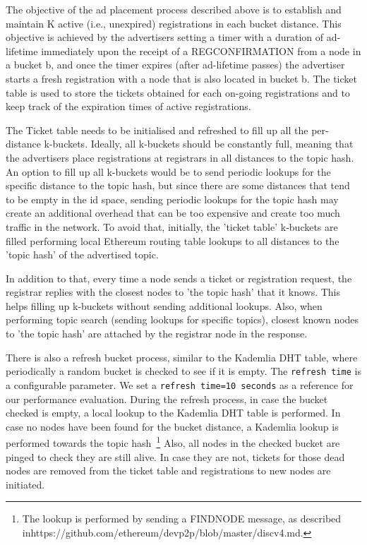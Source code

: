 The objective of the ad placement process described above is to establish and maintain K active (i.e., unexpired) registrations in each bucket distance. 
This objective is achieved by the advertisers setting a timer with a duration of ad-lifetime immediately upon the receipt of a REGCONFIRMATION from a node in a bucket b, and once the timer expires (after ad-lifetime passes) the advertiser starts a fresh registration with a node that is also located in bucket b. 
The ticket table is used to store the tickets obtained for each on-going registrations and to keep track of the expiration times of active registrations.


The Ticket table needs to be initialised and refreshed to fill up all the per-distance k-buckets. 
Ideally,  all k-buckets should be constantly full,  meaning that the advertisers place registrations at registrars in all distances to the topic hash. 
An option to fill up all k-buckets would be to send periodic lookups for the specific distance to the topic hash, but since there are some distances that tend to be empty in the id space,  sending periodic lookups for the topic hash may create an additional overhead that can be too expensive and create too much traffic in the network. To avoid that, initially, the 'ticket table' k-buckets are filled performing local Ethereum routing table lookups to all distances to the 'topic hash' of the advertised topic.

In addition to that, every time a node sends a ticket or registration request, the registrar replies with the closest nodes to 'the topic hash' that it knows. 
This helps filling up k-buckets without sending additional lookups. 
Also, when performing topic search (sending lookups for specific topics),  closest known nodes to 'the topic hash' are attached by the registrar node in the response.

There is  also a refresh bucket process,  similar to the Kademlia DHT table,  where periodically a random bucket is checked to see if it is empty.
The \texttt{refresh time} is a configurable parameter. 
We set a \texttt{refresh time=10 seconds} as a reference for our performance evaluation.
During the refresh process,  in case the bucket checked is empty, 
a local lookup to the Kademlia DHT table is performed. 
In case no nodes have been found for the bucket distance,  a Kademlia lookup is performed towards the topic hash~\footnote{The lookup is performed by sending a FINDNODE message,  as described inhttps://github.com/ethereum/devp2p/blob/master/discv4.md.}
Also, all nodes in the checked bucket are pinged to check they are still alive. 
In case they are not, tickets for those dead nodes are removed from the ticket table and registrations to new nodes are initiated.

